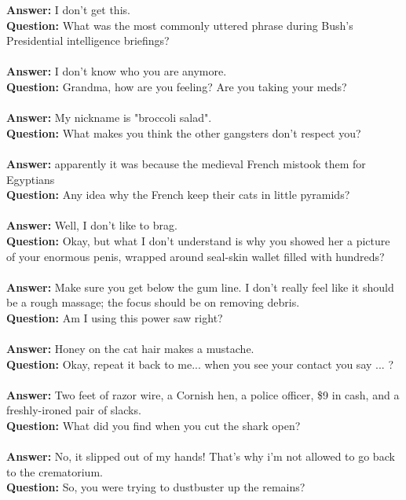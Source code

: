 \documentclass[a4paper]{article}
\begin{document}
\textbf{Answer:} I don't get this. \\
\textbf{Question:} What was the most commonly uttered phrase during Bush's Presidential intelligence briefings? \\ \\
\textbf{Answer:} I don't know who you are anymore. \\
\textbf{Question:} Grandma, how are you feeling? Are you taking your meds? \\ \\
\textbf{Answer:} My nickname is "broccoli salad". \\
\textbf{Question:} What makes you think the other gangsters don't respect you? \\ \\
\textbf{Answer:} apparently it was because the medieval French mistook them for Egyptians \\
\textbf{Question:} Any idea why the French keep their cats in little pyramids? \\ \\
\textbf{Answer:} Well, I don't like to brag. \\
\textbf{Question:} Okay, but what I don't understand is why you showed her a picture of your enormous penis, wrapped around seal-skin wallet filled with hundreds? \\ \\
\textbf{Answer:} Make sure you get below the gum line. I don't really feel like it should be a rough massage; the focus should be on removing debris. \\
\textbf{Question:} Am I using this power saw right? \\ \\
\textbf{Answer:} Honey on the cat hair makes a mustache. \\
\textbf{Question:} Okay, repeat it back to me... when you see your contact you say ... ? \\ \\
\textbf{Answer:} Two feet of razor wire, a Cornish hen, a police officer, \$9 in cash, and a freshly-ironed pair of slacks. \\
\textbf{Question:} What did you find when you cut the shark open? \\ \\
\textbf{Answer:} No, it slipped out of my hands! That's why i'm not allowed to go back to the crematorium. \\
\textbf{Question:} So, you were trying to dustbuster up the remains? \\ \\
\end{document}
